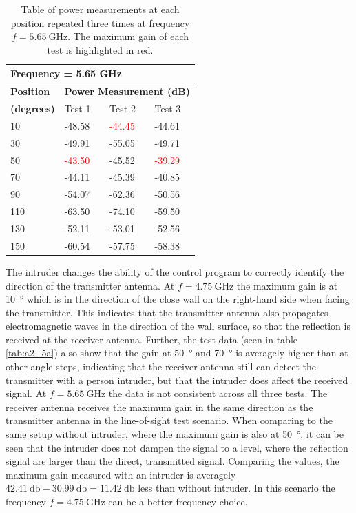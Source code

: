 \begin{table}[H]
    \centering
    \begin{tabular}{l|l|l|l}
        \multicolumn{4}{l}{\textbf{Frequency = 5.65 GHz}}         \\
        \hline
        \textbf{Position} & \multicolumn{3}{l}{\textbf{Power Measurement (dB)}} \\
        \textbf{(degrees)}  & Test 1    & Test 2  & Test 3  \\
        \hline
        \hline
        10      & -48.58    & \textcolor{red}{-44.45}    & -44.61 \\
        30      & -49.91    & -55.05    & -49.71 \\
        50      & \textcolor{red}{-43.50}    & -45.52    & \textcolor{red}{-39.29} \\
        70      & -44.11    & -45.39    & -40.85 \\
        90      & -54.07    & -62.36    & -50.56 \\
        110     & -63.50    & -74.10    & -59.50 \\
        130     & -52.11    & -53.01    & -52.56 \\
        150     & -60.54    & -57.75    & -58.38
        \end{tabular}
    \caption{Table of power measurements at each position repeated three times at frequency $f=\SI{5.65}{\giga\hertz}$. The maximum gain of each test is highlighted in red.}
    \label{tab:a2_5b}
\end{table}

The intruder changes the ability of the control program to correctly identify the direction of the transmitter antenna. At $f=\SI{4.75}{\giga\hertz}$ the maximum gain is at \SI{10}{\degree} which is in the direction of the close wall on the right-hand side when facing the transmitter. This indicates that the transmitter antenna also propagates electromagnetic waves in the direction of the wall surface, so that the reflection is received at the receiver antenna. Further, the test data (seen in table \ref{tab:a2_5a}) also show that the gain at \SI{50}{\degree} and \SI{70}{\degree} is averagely higher than at other angle steps, indicating that the receiver antenna still can detect the transmitter with a person intruder, but that the intruder does affect the received signal. At $f=\SI{5.65}{\giga\hertz}$ the data is not consistent across all three tests. The receiver antenna receives the maximum gain in the same direction as the transmitter antenna in the line-of-sight test scenario. When comparing to the same setup without intruder, where the maximum gain is also at \SI{50}{\degree}, it can be seen that the intruder does not dampen the signal to a level, where the reflection signal are larger than the direct, transmitted signal. Comparing the values, the maximum gain measured with an intruder is averagely $\SI{42.41}{\decibel}-\SI{30.99}{\decibel}=\SI{11.42}{\decibel}$ less than without intruder. In this scenario the frequency $f=\SI{4.75}{\giga\hertz}$ can be a better frequency choice.

